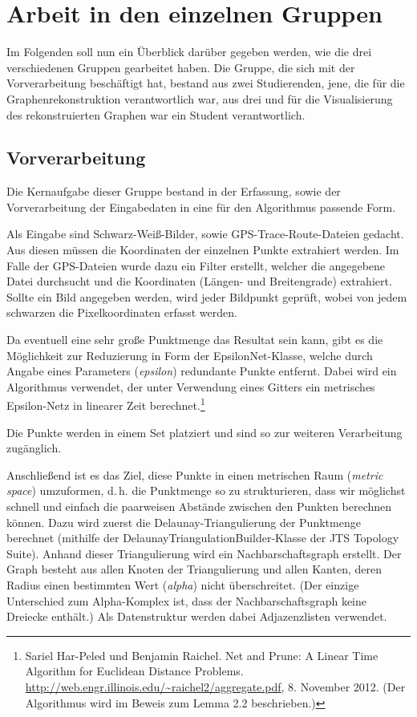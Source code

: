 \documentclass[parskip=half,
 fontsize=12pt, bibtotoc,
 ngerman]
 {article}
\begin{document}
\section{Arbeit in den einzelnen Gruppen}
Im Folgenden soll nun ein Überblick darüber gegeben werden, wie die drei verschiedenen Gruppen gearbeitet haben. Die Gruppe, die sich mit der Vorverarbeitung beschäftigt hat, bestand aus zwei Studierenden, jene, die für die Graphenrekonstruktion verantwortlich war, aus drei und für die Visualisierung des rekonstruierten Graphen war ein Student verantwortlich.

\subsection{Vorverarbeitung}
Die Kernaufgabe dieser Gruppe bestand in der Erfassung, sowie der Vorverarbeitung der Eingabedaten in eine für den Algorithmus passende Form.

Als Eingabe sind Schwarz-Weiß-Bilder, sowie GPS-Trace-Route-Dateien gedacht. Aus diesen müssen die Koordinaten der einzelnen Punkte extrahiert werden. Im Falle der GPS-Dateien wurde dazu ein Filter erstellt, welcher die angegebene Datei durchsucht und die Koordinaten (Längen- und Breitengrade) extrahiert. Sollte ein Bild angegeben werden, wird jeder Bildpunkt geprüft, wobei von jedem schwarzen die Pixelkoordinaten erfasst werden.

Da eventuell eine sehr große Punktmenge das Resultat sein kann, gibt es die Möglichkeit zur Reduzierung in Form der EpsilonNet-Klasse, welche durch Angabe eines Parameters (\emph{epsilon}) redundante Punkte entfernt. Dabei wird ein Algorithmus verwendet, der unter Verwendung eines Gitters ein metrisches Epsilon-Netz in linearer Zeit berechnet.\footnote{Sariel Har-Peled und Benjamin Raichel. Net and Prune: A Linear Time Algorithm for Euclidean Distance Problems. \url{http://web.engr.illinois.edu/~raichel2/aggregate.pdf}, 8. November 2012. (Der Algorithmus wird im Beweis zum Lemma 2.2 beschrieben.)}

Die Punkte werden in einem Set platziert und sind so zur weiteren Verarbeitung zugänglich.

Anschließend ist es das Ziel, diese Punkte in einen metrischen Raum (\textit{metric space}) umzuformen, d.\,h. die Punktmenge so zu strukturieren, dass wir möglichst schnell und einfach die paarweisen Abstände zwischen den Punkten berechnen können. Dazu wird zuerst die Delaunay-Triangulierung der Punktmenge berechnet (mithilfe der Delaunay\allowbreak TriangulationBuilder-Klasse der JTS Topology Suite). Anhand dieser Triangulierung wird ein Nachbarschaftsgraph erstellt. Der Graph besteht aus allen Knoten der Triangulierung und allen Kanten, deren Radius einen bestimmten Wert (\emph{alpha}) nicht überschreitet. (Der einzige Unterschied zum Alpha-Komplex ist, dass der Nachbarschaftsgraph keine Dreiecke enthält.) Als Datenstruktur werden dabei Adjazenzlisten verwendet.
\end{document}
